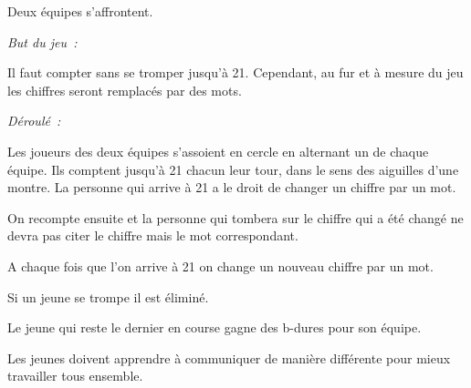 \documentclass{grand-jeu}
\begin{document}
\begin{regles}
Deux équipes s’affrontent.

\vspace{0.2cm}
\emph{But du jeu :}

Il faut compter sans se tromper jusqu'à 21. Cependant, au fur et à mesure du jeu les chiffres seront remplacés par des mots. 

\vspace{0.2cm}
\emph{Déroulé :}

Les joueurs des deux équipes s'assoient en cercle en alternant un de chaque équipe. Ils comptent jusqu'à 21 chacun leur tour, dans le sens des aiguilles d’une montre. La personne qui arrive à 21 a le droit de changer un chiffre par un mot. 

On recompte ensuite et la personne qui tombera sur le chiffre qui a été changé ne devra pas citer le chiffre mais le mot correspondant. 

A chaque fois que l'on arrive à 21 on change un nouveau chiffre par un mot. 

Si un jeune se trompe il est éliminé.

Le jeune qui reste le dernier en course gagne des b-dures pour son équipe.
\end{regles}

\begin{imaginaire}
Les jeunes doivent apprendre à communiquer de manière différente pour mieux travailler tous ensemble.
\end{imaginaire}

\begin{moments-stop}
\end{moments-stop}
\end{document}
